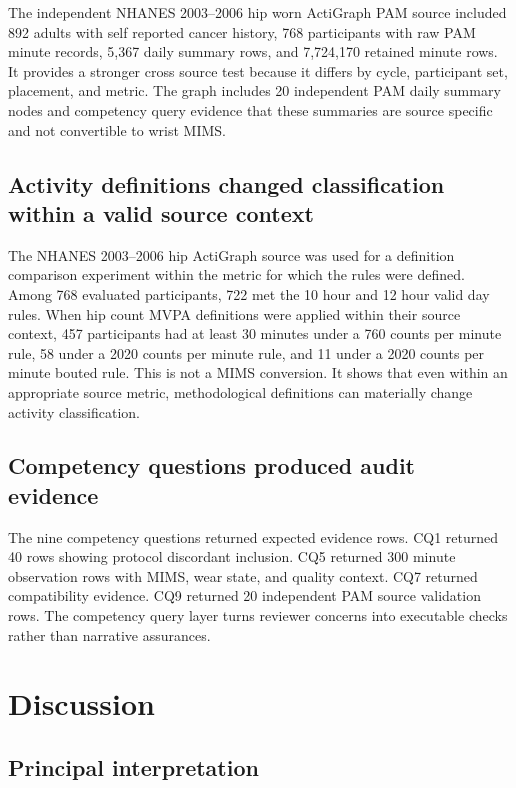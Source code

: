 \documentclass[final,5p,times,twocolumn]{elsarticle}
\begin{document}
The independent NHANES 2003--2006 hip worn ActiGraph PAM source included 892 adults with self reported cancer history, 768 participants with raw PAM minute records, 5,367 daily summary rows, and 7,724,170 retained minute rows. It provides a stronger cross source test because it differs by cycle, participant set, placement, and metric. The graph includes 20 independent PAM daily summary nodes and competency query evidence that these summaries are source specific and not convertible to wrist MIMS.

\subsection{Activity definitions changed classification within a valid source context}

The NHANES 2003--2006 hip ActiGraph source was used for a definition comparison experiment within the metric for which the rules were defined. Among 768 evaluated participants, 722 met the 10 hour and 12 hour valid day rules. When hip count MVPA definitions were applied within their source context, 457 participants had at least 30 minutes under a 760 counts per minute rule, 58 under a 2020 counts per minute rule, and 11 under a 2020 counts per minute bouted rule. This is not a MIMS conversion. It shows that even within an appropriate source metric, methodological definitions can materially change activity classification.

\subsection{Competency questions produced audit evidence}

The nine competency questions returned expected evidence rows. CQ1 returned 40 rows showing protocol discordant inclusion. CQ5 returned 300 minute observation rows with MIMS, wear state, and quality context. CQ7 returned compatibility evidence. CQ9 returned 20 independent PAM source validation rows. The competency query layer turns reviewer concerns into executable checks rather than narrative assurances.

\section{Discussion}
\label{sec:discussion}

\subsection{Principal interpretation}
\end{document}
